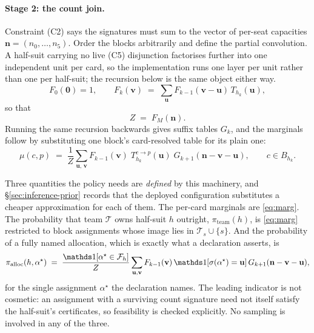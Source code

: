 \paragraph{Stage 2: the count join.} Constraint (C2) says the signatures must sum to the vector of
per-seat capacities $\mathbf{n} = (n_0,\dots,n_5)$. Order the blocks arbitrarily and define the partial convolution. A half-suit carrying no live (C5)
disjunction factorises further into one independent unit per card, so the implementation runs one
layer per unit rather than one per half-suit; the recursion below is the same object either way.
\begin{equation}
  F_0(\mathbf{0}) = 1, \qquad
  F_k(\mathbf{v}) \;=\; \sum_{\mathbf{u}} F_{k-1}(\mathbf{v}-\mathbf{u})\, T_{h_k}(\mathbf{u}),
  \label{eq:dp}
\end{equation}
so that
\begin{equation}
  Z \;=\; F_M(\mathbf{n}).
  \label{eq:Z}
\end{equation}
Running the same recursion backwards gives suffix tables $G_k$, and the marginals follow by
substituting one block's card-resolved table for its plain one:
\begin{equation}
  \mu(c,p) \;=\; \frac{1}{Z}\sum_{\mathbf{u},\,\mathbf{v}}
  F_{k-1}(\mathbf{v})\; T_{h_k}^{c \to p}(\mathbf{u})\; G_{k+1}(\mathbf{n}-\mathbf{v}-\mathbf{u}),
  \qquad c \in B_{h_k}.
  \label{eq:marg}
\end{equation}

Three quantities the policy needs are \emph{defined} by this machinery, and
\S\ref{sec:inference-prior} records that the deployed configuration substitutes a cheaper
approximation for each of them. The per-card marginals are \eqref{eq:marg}. The probability that team
$\mathcal{T}$ owns half-suit $h$ outright, $\pi_{\mathrm{team}}(h)$, is \eqref{eq:marg} restricted to
block assignments whose image lies in $\mathcal{T}_s \cup \{s\}$. And the probability of a fully named allocation,
which is exactly what a declaration asserts, is
\begin{equation}
  \pi_{\mathrm{alloc}}(h, \alpha^\star) \;=\;
  \frac{\ind\!\left[\alpha^\star \in \mathcal{F}_h\right]}{Z}
  \sum_{\mathbf{u}, \mathbf{v}} F_{k-1}(\mathbf{v})\,
  \ind\!\left[\sigma(\alpha^\star) = \mathbf{u}\right]
  G_{k+1}(\mathbf{n}-\mathbf{v}-\mathbf{u}),
  \label{eq:alloc}
\end{equation}
for the single assignment $\alpha^\star$ the declaration names. The leading indicator is not
cosmetic: an assignment with a surviving count signature need not itself satisfy the half-suit's
certificates, so feasibility is checked explicitly. No sampling is involved in any of the three.


